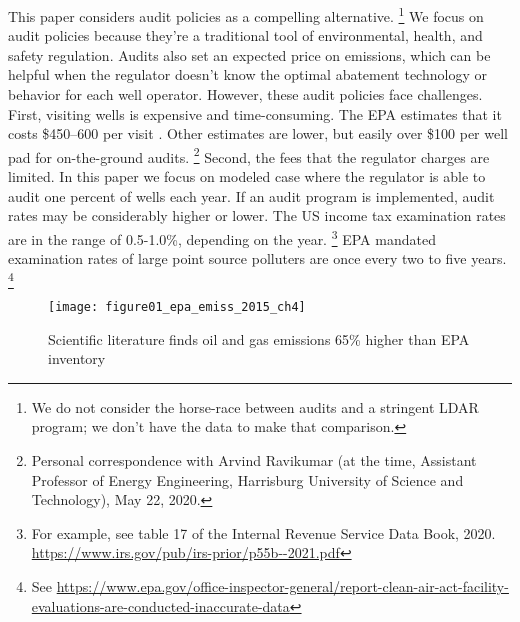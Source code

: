 This paper considers audit policies as a compelling alternative.%
\footnote{%
We do not consider the horse-race between audits and a stringent \gls{LDAR} program;
we don't have the data to make that comparison.
}
We focus on audit policies because they're a traditional tool of environmental, health, and safety regulation.
Audits also set an expected price on emissions, which can be helpful when the regulator doesn't know the optimal abatement technology or behavior for each well operator.
However, these audit policies face challenges.
First, visiting wells is expensive and time-consuming.
The \gls{EPA} estimates that it costs \$450--600 per visit \parencite{epaRule2020}.
Other estimates are lower, but easily over \$100 per well pad for on-the-ground audits.%
\footnote{Personal correspondence with Arvind Ravikumar (at the time, Assistant Professor of Energy Engineering, Harrisburg University of Science and Technology), May 22, 2020.}
Second, the fees that the regulator charges are limited.
In this paper we focus on modeled case where the regulator is able to audit one percent of wells each year.
If an audit program is implemented, audit rates may be considerably higher or lower.
The US income tax examination rates are in the range of 0.5-1.0\%, depending on the year.%
\footnote{For example, see table 17 of the Internal Revenue Service Data Book, 2020.
\url{https://www.irs.gov/pub/irs-prior/p55b--2021.pdf}}
\gls{EPA} mandated examination rates of large point source polluters are once every two to five years.%
\footnote{See \href{https://www.epa.gov/office-inspector-general/report-clean-air-act-facility-evaluations-are-conducted-inaccurate-data}{https://www.epa.gov/office-inspector-general/report-clean-air-act-facility-evaluations-are-conducted-inaccurate-data}}


\begin{wrapfigure}[15]{L}{0.5\textwidth}
\vspace*{-0.385\baselineskip}

\centering
\begin{minipage}{0.45\textwidth}
  \caption{Scientific literature finds oil and gas emissions 65\% higher than \gls{EPA} inventory}
  \label{fig:epa-inventory-comparison}
\end{minipage}

\noindent
\texttt{[image: figure01\_epa\_emiss\_2015\_ch4]}
\vspace*{-2\baselineskip}
\end{wrapfigure}

